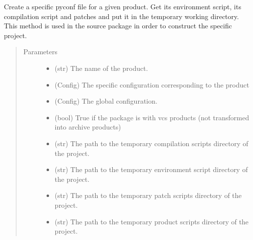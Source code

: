 \documentclass[a4paper,10pt,english]{sphinxmanual}
\begin{document}
\begin{fulllineitems}
\label{\detokenize{apidoc_commands/commands:commands.package.find_product_scripts_and_pyconf}}
Create a specific pyconf file for a given product. 
Get its environment script, its compilation script 
and patches and put it in the temporary working directory. 
This method is used in the source package in order to
construct the specific project.
\begin{quote}\begin{description}
\item[{Parameters}] \leavevmode\begin{itemize}
\item {} 
 \textendash{} (str) The name of the product.

\item {} 
 \textendash{} (Config) The specific configuration corresponding to the product

\item {} 
 \textendash{} (Config) The global configuration.

\item {} 
 \textendash{} (bool) 
True if the package is with vcs products 
(not transformed into archive products)

\item {} 
 \textendash{} (str) 
The path to the temporary compilation scripts directory of the project.

\item {} 
 \textendash{} (str) 
The path to the temporary environment script directory of the project.

\item {} 
 \textendash{} (str) 
The path to the temporary patch scripts directory of the project.

\item {} 
 \textendash{} (str) 
The path to the temporary product scripts directory of the project.

\end{itemize}

\end{description}\end{quote}

\end{fulllineitems}
\end{document}
